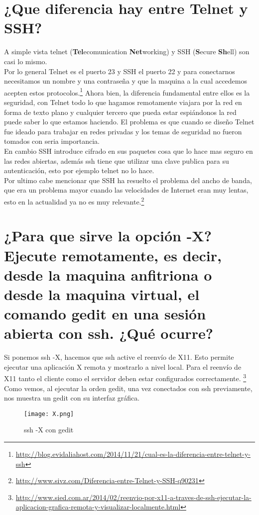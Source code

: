 \section{¿Que diferencia hay entre Telnet y SSH?}

A simple vista telnet (\textbf{Tel}ecomunication \textbf{Net}working) y SSH (\textbf{S}ecure\textbf{ Sh}ell) son casi lo mismo.
\\Por lo general Telnet es el puerto 23 y SSH el puerto 22 y para conectarnos necesitamos un nombre y una contraseña y que la maquina a la cual accedemos acepten estos protocolos.\footnote{\url{http://blog.evidaliahost.com/2014/11/21/cual-es-la-diferencia-entre-telnet-y-ssh}}
Ahora bien, la diferencia fundamental entre ellos es la seguridad, con Telnet todo lo que hagamos remotamente viajara por la red en forma de texto plano y cualquier tercero que pueda estar espiándonos la red puede saber lo que estamos haciendo. El problema es que cuando se diseño Telnet fue ideado para trabajar en redes privadas y los temas de seguridad no fueron tomados con seria importancia.
\\En cambio SSH introduce cifrado en sus paquetes cosa que lo hace mas seguro en las redes abiertas, además ssh tiene que utilizar una clave publica para su autenticación, esto por ejemplo telnet no lo hace.
\\Por ultimo cabe mencionar que SSH ha resuelto el problema del ancho de banda, que era un problema mayor cuando las velocidades de Internet eran muy lentas, esto en la actualidad ya no es muy relevante.\footnote{\url{http://www.sivz.com/Diferencia-entre-Telnet-y-SSH-q90231}}

\section{¿Para que sirve la opción -X? Ejecute remotamente, es decir, desde la maquina anfitriona o desde la maquina virtual, el comando gedit en una sesión abierta con ssh. ¿Qué ocurre?}
Si ponemos ssh -X, hacemos que ssh active el reenvío de X11. Esto permite ejecutar una aplicación X remota y mostrarlo a nivel local. Para el reenvío de X11 tanto el cliente como el servidor deben estar configurados correctamente. \footnote{\url{http://www.sied.com.ar/2014/02/reenvio-por-x11-a-traves-de-ssh-ejecutar-la-aplicacion-grafica-remota-y-visualizar-localmente.html}}
Como vemos, al ejecutar la orden gedit, una vez conectados con ssh previamente, nos muestra un gedit con su interfaz gráfica.
\begin{figure}[H] 
\centering
\texttt{[image: X.png]}  
\label{figura1:}
\caption{ssh -X con gedit}
\end{figure}

